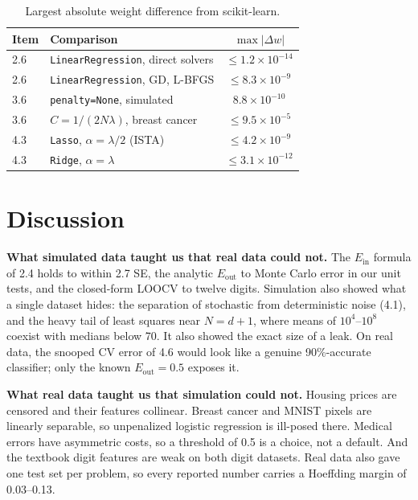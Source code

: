 \documentclass[conference]{IEEEtran}
\newcommand{\Ein}{E_{\mathrm{in}}}
\newcommand{\Eout}{E_{\mathrm{out}}}
\begin{document}
\begin{table}[!t]
\caption{Largest absolute weight difference from scikit-learn.}
\label{tab:lib}
\centering\footnotesize
\begin{tabular}{llc}
\toprule
Item & Comparison & $\max|\Delta w|$\\
\midrule
2.6 & \texttt{LinearRegression}, direct solvers & $\le1.2\times10^{-14}$\\
2.6 & \texttt{LinearRegression}, GD, L-BFGS & $\le8.3\times10^{-9}$\\
3.6 & \texttt{penalty=None}, simulated & $8.8\times10^{-10}$\\
3.6 & $C=1/(2N\lambda)$, breast cancer & $\le9.5\times10^{-5}$\\
4.3 & \texttt{Lasso}, $\alpha=\lambda/2$ (ISTA) & $\le4.2\times10^{-9}$\\
4.3 & \texttt{Ridge}, $\alpha=\lambda$ & $\le3.1\times10^{-12}$\\
\bottomrule
\end{tabular}
\end{table}

\section{Discussion}\label{sec:disc}
\textbf{What simulated data taught us that real data could not.} The $\Ein$ formula of 2.4 holds to within 2.7 SE, the analytic $\Eout$ to Monte Carlo error in our unit tests, and the closed-form LOOCV to twelve digits. Simulation also showed what a single dataset hides: the separation of stochastic from deterministic noise (4.1), and the heavy tail of least squares near $N=d+1$, where means of $10^4$--$10^8$ coexist with medians below 70. It also showed the exact size of a leak. On real data, the snooped CV error of 4.6 would look like a genuine 90\%-accurate classifier; only the known $\Eout=0.5$ exposes it.

\textbf{What real data taught us that simulation could not.} Housing prices are censored and their features collinear. Breast cancer and MNIST pixels are linearly separable, so unpenalized logistic regression is ill-posed there. Medical errors have asymmetric costs, so a threshold of 0.5 is a choice, not a default. And the textbook digit features are weak on both digit datasets. Real data also gave one test set per problem, so every reported number carries a Hoeffding margin of 0.03--0.13.
\end{document}
